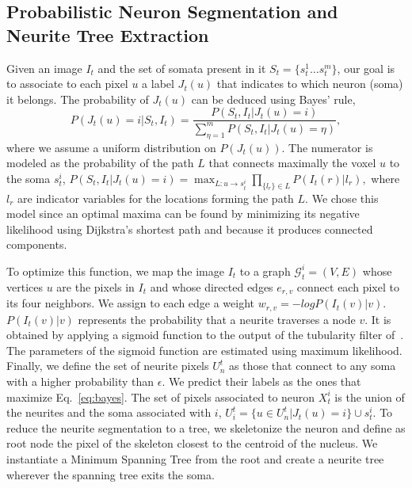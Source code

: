 \subsection{Probabilistic Neuron Segmentation and Neurite Tree Extraction}
\label{sec:segmentation}
\vspace{-2mm}
Given an  image $I_t$  and the set  of somata  present in it  $S_t=\{s_t^1 \dots
s_t^m \}$,  our goal is  to associate  to each pixel  $u$ a label  $J_t(u)$ that
indicates to which neuron (soma) it belongs.   The probability of $J_t(u)$ can be deduced
using Bayes' rule,
\begin{equation}
  \label{eq:bayes}
  P(J_t(u)=i|S_t,I_t) = \frac{P(S_t,I_t| J_t(u)=i)}{\sum_{\eta=1}^m P(S_t,I_t|J_t(u)=\eta)},
\end{equation}
\noindent  where we  assume  a uniform  distribution on  $P(J_t(u))$.  The
numerator  is modeled  as the  probability of the path $L$ that connects maximally 
the voxel $u$ to the soma $s_t^i$,
$  P(S_t,I_t| J_t(u)=i) = \max_{L:u\rightarrow  s_t^i}   \prod_{\{l_{r}\}
    \in L  } P(I_t(r)|l_{r}),$
where $l_{r}$ are indicator  variables for the locations forming the
path $L$. We chose this model  since an optimal maxima can be found
by minimizing its  negative likelihood using Dijkstra's shortest  path and because
it produces connected components.

To optimize this function, we map  the image  $I_t$ to  a graph  $\mathcal{G}_t^i =
(V,E)$ whose vertices  $u$ are the pixels in  $I_t$ and whose directed
edges $e_{r,v}$ connect  each pixel to its four  neighbors.  We assign
to  each edge a  weight $w_{r,v}  = -log  P(I_t(v)|v)$.  $P(I_t(v)|v)$
represents the probability that a  neurite traverses a node $v$. It is
obtained  by  applying  a  sigmoid  function  to  the  output  of  the
tubularity filter  of~\cite{Frangi98}.  The parameters  of the sigmoid
function are  estimated using  maximum likelihood. Finally,  we define
the set  of neurite pixels $U_n^t$  as those that connect  to any soma
with a higher probability than $\epsilon$.  We predict their labels as
the  ones  that  maximize   Eq.~\ref{eq:bayes}.   The  set  of  pixels
associated to neuron $X_t^i$ is the union of the neurites and the soma
associated  with $i$, $  U_i^t =  \{u \in  U_n^t |  J_t(u) =  i\} \cup
s_t^i$. To reduce  the neurite segmentation to a  tree, we skeletonize
the neuron and  define as root node the pixel  of the skeleton closest
to the centroid of the nucleus. We instantiate a Minimum Spanning Tree
from the  root and create a  neurite tree wherever the spanning tree
exits the soma.




